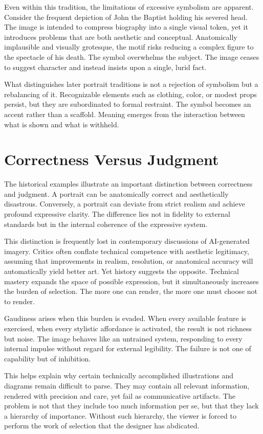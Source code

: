 \documentclass[12pt]{article}
\begin{document}
Even within this tradition, the limitations of excessive symbolism are apparent. Consider the frequent depiction of John the Baptist holding his severed head. The image is intended to compress biography into a single visual token, yet it introduces problems that are both aesthetic and conceptual. Anatomically implausible and visually grotesque, the motif risks reducing a complex figure to the spectacle of his death. The symbol overwhelms the subject. The image ceases to suggest character and instead insists upon a single, lurid fact.

What distinguishes later portrait traditions is not a rejection of symbolism but a rebalancing of it. Recognizable elements such as clothing, color, or modest props persist, but they are subordinated to formal restraint. The symbol becomes an accent rather than a scaffold. Meaning emerges from the interaction between what is shown and what is withheld.

\section{Correctness Versus Judgment}

The historical examples illustrate an important distinction between correctness and judgment. A portrait can be anatomically correct and aesthetically disastrous. Conversely, a portrait can deviate from strict realism and achieve profound expressive clarity. The difference lies not in fidelity to external standards but in the internal coherence of the expressive system.

This distinction is frequently lost in contemporary discussions of AI-generated imagery. Critics often conflate technical competence with aesthetic legitimacy, assuming that improvements in realism, resolution, or anatomical accuracy will automatically yield better art. Yet history suggests the opposite. Technical mastery expands the space of possible expression, but it simultaneously increases the burden of selection. The more one can render, the more one must choose not to render.

Gaudiness arises when this burden is evaded. When every available feature is exercised, when every stylistic affordance is activated, the result is not richness but noise. The image behaves like an untrained system, responding to every internal impulse without regard for external legibility. The failure is not one of capability but of inhibition.

This helps explain why certain technically accomplished illustrations and diagrams remain difficult to parse. They may contain all relevant information, rendered with precision and care, yet fail as communicative artifacts. The problem is not that they include too much information per se, but that they lack a hierarchy of importance. Without such hierarchy, the viewer is forced to perform the work of selection that the designer has abdicated.
\end{document}
